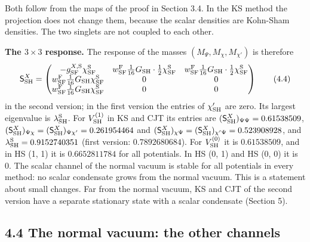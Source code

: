 \documentclass[
  10pt,
]{article}
\begin{document}
Both follow from the maps of the proof in Section 3.4. In the KS method
the projection does not change them, because the scalar densities are
Kohn-Sham densities. The two singlets are not coupled to each other.

\textbf{The \(3\times3\) response.} The response of the masses
\((M_\Psi,M_\chi,M_{\chi'})\) is therefore
\[\mathsf S^X_{\rm SH}=\begin{pmatrix}-g^{X,{\rm S}}_{\rm SF}\chi^{\rm S}_{\rm SF}&w^{\rm F}_{\rm SF}\tfrac1{16}G_{\rm SH}\cdot\tfrac12\chi^{\rm S}_{\rm SF}&w^{\rm F}_{\rm SF}\tfrac1{16}G_{\rm SH}\cdot\tfrac12\chi^{\rm S}_{\rm SF}\\w^{\rm F}_{\rm SF}\tfrac1{16}G_{\rm SH}\chi^{\rm S}_{\rm SF}&0&0\\w^{\rm F}_{\rm SF}\tfrac1{16}G_{\rm SH}\chi^{\rm S}_{\rm SF}&0&0\end{pmatrix}\tag{4.4}\]
in the second version; in the first version the entries of
\(\chi'_{\rm SH}\) are zero. Its largest eigenvalue is
\(\lambda^{\rm S}_{\rm SH}\). For \(V^{(1)}_{\rm SH}\) in KS and CJT its
entries are \((\mathsf S^X_{\rm SH})_{\Psi\Psi}=0.61538509\),
\((\mathsf S^X_{\rm SH})_{\Psi\chi}=(\mathsf S^X_{\rm SH})_{\Psi\chi'}=0.261954464\)
and
\((\mathsf S^X_{\rm SH})_{\chi\Psi}=(\mathsf S^X_{\rm SH})_{\chi'\Psi}=0.523908928\),
and \(\lambda^{\rm S}_{\rm SH}=0.9152740351\) (first version:
\(0.7892680684\)). For \(V^{(0)}_{\rm SH}\) it is \(0.61538509\), and in
HS (1, 1) it is \(0.6652811784\) for all potentials. In HS (0, 1) and HS
(0, 0) it is 0. The scalar channel of the normal vacuum is stable for
all potentials in every method: no scalar condensate grows from the
normal vacuum. This is a statement about small changes. Far from the
normal vacuum, KS and CJT of the second version have a separate
stationary state with a scalar condensate (Section 5).

\hypertarget{the-normal-vacuum-the-other-channels}{%
\subsection{4.4 The normal vacuum: the other
channels}\label{the-normal-vacuum-the-other-channels}}
\end{document}
